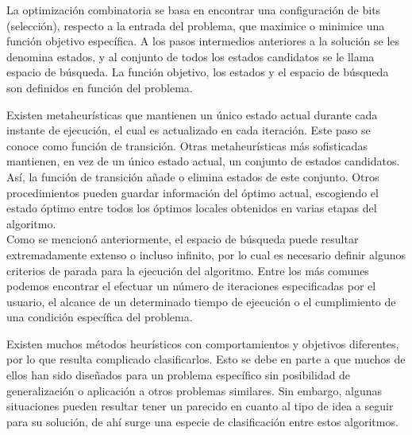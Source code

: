 \documentclass[a4paper,openright,11pt,oneside]{book}
\begin{document}
	La optimización combinatoria se basa en encontrar una configuración de bits (selección), respecto a la entrada del problema, que maximice o minimice una función objetivo específica. A los pasos intermedios anteriores a la solución se les denomina estados, y al conjunto de todos los estados candidatos se le llama espacio de búsqueda. La función objetivo, los estados y el espacio de búsqueda son definidos en función del problema.
	
	Existen metaheurísticas que mantienen un único estado actual durante cada instante de ejecución, el cual es actualizado en cada iteración. Este paso se conoce como función de transición. Otras metaheurísticas más sofisticadas mantienen, en vez de un único estado actual, un conjunto de estados candidatos. Así, la función de transición añade o elimina estados de este conjunto. Otros procedimientos pueden guardar información del óptimo actual, escogiendo el estado óptimo entre todos los óptimos locales obtenidos en varias etapas del algoritmo. \\
	
	Como se mencionó anteriormente, el espacio de búsqueda puede resultar extremadamente extenso o incluso infinito, por lo cual es necesario definir algunos criterios de parada para la ejecución del algoritmo. Entre los más comunes podemos encontrar el efectuar un número de iteraciones especificadas por el usuario, el alcance de un determinado tiempo de ejecución o el cumplimiento de una condición específica del problema.
	
	Existen muchos métodos heurísticos con comportamientos y objetivos diferentes, por lo que resulta complicado clasificarlos. Esto se debe en parte a que muchos de  ellos  han  sido  diseñados para un problema específico sin posibilidad de generalización o aplicación a otros problemas similares. Sin embargo, algunas situaciones pueden resultar tener un parecido en cuanto al tipo de idea a seguir para su solución, de ahí surge una especie de clasificación entre estos algoritmos.
	
\end{document}
